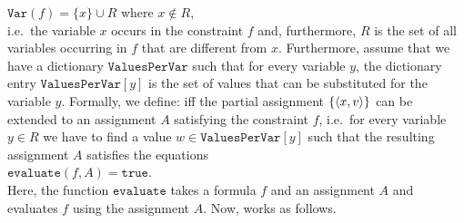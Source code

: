 $\texttt{Var}(f) = \{ x \} \cup R$ \quad where $x \not\in R$,
\\[0.2cm]
i.e.~the variable $x$ occurs in the constraint $f$ and, furthermore, $R$ is the set of all variables occurring
in $f$ that are different from $x$.  Furthermore, assume that we have a dictionary $\texttt{ValuesPerVar}$ such that
for every variable $y$, the dictionary entry $\texttt{ValuesPerVar}[y]$ is the set of values that can be substituted
for the variable $y$.  Formally, we define:  
iff the partial assignment $\{ \pair(x, v) \}$ can be extended to an assignment $A$ satisfying the constraint $f$,
i.e.~for every variable $y \in R$ we have to find a value $w \in \texttt{ValuesPerVar}[y]$ such that the resulting
assignment $A$ satisfies the equations
\\[0.2cm]
\hspace*{1.3cm}
$\texttt{evaluate}(f, A) = \texttt{true}$.
\\[0.2cm]
Here, the function $\texttt{evaluate}$ takes a formula $f$ and an assignment $A$ and evaluates $f$ using the
assignment $A$.  Now,  works as follows.

